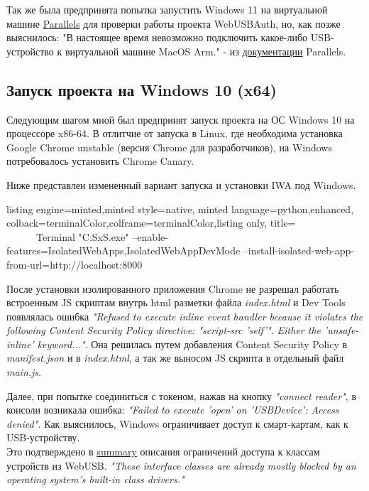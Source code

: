 \documentclass[12pt]{article}
\begin{document}
Так же была предпринята попытка запустить Windows 11 на виртуальной машине \href{https://www.parallels.com}{{Parallels}} для проверки работы проекта WebUSBAuth, но, как позже выяснилось: "В настоящее время невозможно подключить какое-либо USB-устройство к виртуальной машине MacOS Arm." - из \href{https://kb.parallels.com/128867}{{документации}} Parallels. 

\subsection{Запуск проекта на Windows 10 (x64)}
Следующим шагом мной был предпринят запуск проекта на ОС Windows 10 на процессоре x86-64. В отлитчие от запуска в Linux, где необходима установка Google Chrome unstable (версия Chrome для разработчиков), на Windows потребовалось установить Chrome Canary. 

Ниже представлен измененный вариант запуска и установки IWA под Windows.
\begin{tcblisting}{listing engine=minted,minted style=native,
    minted language=python,enhanced,
    colback=terminalColor,colframe=terminalColor,listing only, title= ~~~~~~Terminal}
    "C:\Users{}\AppData\Local\Google\Chrome SxS\Application\chrome.exe" --enable-features=IsolatedWebApps,IsolatedWebAppDevMode --install-isolated-web-app-from-url=http://localhost:8000
\end{tcblisting}
После установки изолированного приложения Chrome не разрешал работать встроенным JS скриптам внутрь html разметки файла \emph{index.html} и Dev Tools появлялась ошибка \emph{"Refused to execute inline event handler because it violates the following Content Security Policy directive: "script-src 'self'". Either the 'unsafe-inline' keyword..."}. Она решилась путем добавления Content Security Policy в \emph{manifest.json} и в \emph{index.html}, а так же выносом JS скрипта в отдельный файл \emph{main.js}. 

Далее, при попытке соединиться с токеном, нажав на кнопку \emph{"connect reader"}, в консоли возникала ошибка: \emph{"Failed to execute 'open' on
'USBDevice': Access denied".} Как выяснилось, Windows ограничивает доступ к смарт-картам, как к USB-устройству. \\
Это подтверждено в \href{https://groups.google.com/a/chromium.org/g/blink-dev/c/LZXocaeCwDw/m/GLfAffGLAAAJ}{{summary}} описания ограничений доступа к классам устройств из WebUSB. \emph{"These interface classes are already mostly blocked by an operating system’s built-in class drivers."}
\end{document}
